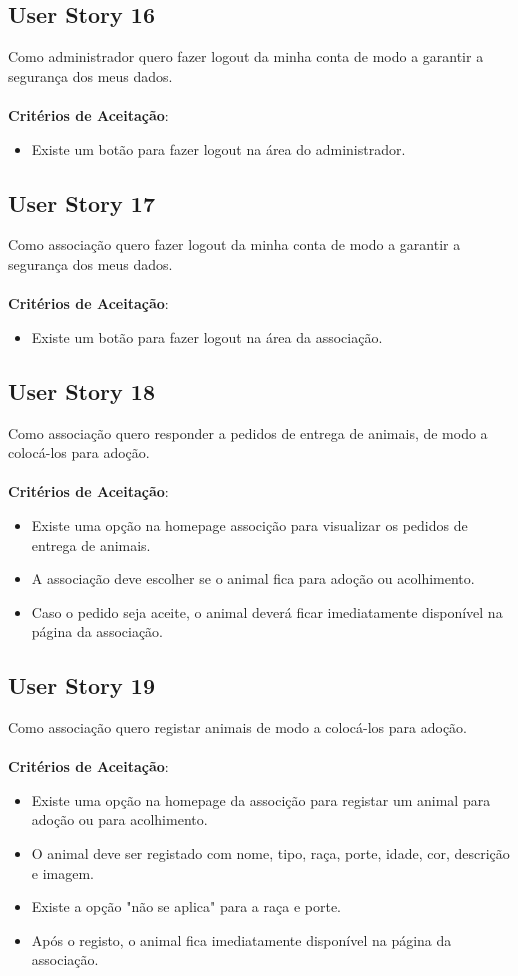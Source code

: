 \documentclass[a4paper,11pt]{article}
\begin{document}
\subsection{User Story 16}
Como administrador quero fazer logout da minha conta de modo a garantir a segurança dos meus dados.\\\\
\textbf{Critérios de Aceitação}:
\begin{itemize}
  \item Existe um botão para fazer logout na área do administrador.
\end{itemize}

\subsection{User Story 17}
Como associação quero fazer logout da minha conta de modo a garantir a segurança dos meus dados.\\\\
\textbf{Critérios de Aceitação}:
\begin{itemize}
  \item Existe um botão para fazer logout na área da associação.
\end{itemize}

\subsection{User Story 18}
Como associação quero responder a pedidos de entrega de animais, de modo a colocá-los para adoção.\\\\
\textbf{Critérios de Aceitação}:
\begin{itemize}
  \item Existe uma opção na homepage associção para visualizar os pedidos de entrega de animais.
  \item A associação deve escolher se o animal fica para adoção ou acolhimento.
  \item Caso o pedido seja aceite, o animal deverá ficar imediatamente disponível na página da associação.
\end{itemize}

\subsection{User Story 19}
Como associação quero registar animais de modo a colocá-los para adoção.\\\\
\textbf{Critérios de Aceitação}:
\begin{itemize}
  \item Existe uma opção na homepage da associção para registar um animal para adoção ou para acolhimento.
  \item O animal deve ser registado com nome, tipo, raça, porte, idade, cor, descrição e imagem.
  \item Existe a opção "não se aplica" para a raça e porte.
  \item Após o registo, o animal fica imediatamente disponível na página da associação.
\end{itemize}
\end{document}
